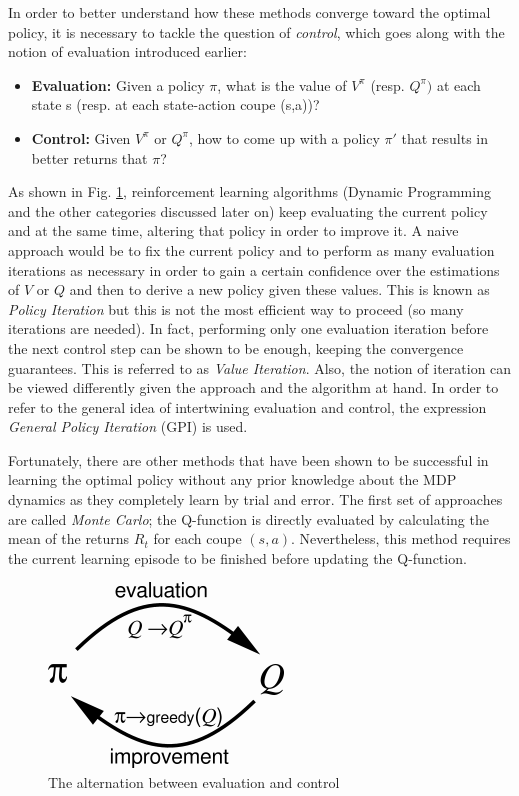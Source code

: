 				In order to better understand how these methods converge toward the optimal policy, it is necessary to tackle the question of \textit{control}, which goes along with the notion of evaluation introduced earlier:
				
				\begin{itemize}
					\item \textbf{Evaluation:} Given a policy $\pi$, what is the value of $V^{\pi}$ (resp. $Q^{\pi})$ at each state s (resp. at each state-action coupe (s,a))?
					\item \textbf{Control:} Given $V^{\pi}$ or $Q^{\pi}$, how to come up with a policy $\pi'$ that results in better returns that $\pi$?
				\end{itemize}
				
				As shown in Fig. \ref{fig:evalctrl}, reinforcement learning algorithms (Dynamic Programming and the other categories discussed later on) keep evaluating the current policy and at the same time, altering that policy in order to improve it. A naive approach would be to fix the current policy and to perform as many evaluation iterations as necessary in order to gain a certain confidence over the estimations of $V$ or $Q$ and then to derive a new policy given these values. This is known as \textit{Policy Iteration} but this is not the most efficient way to proceed (so many iterations are needed). In fact, performing only one evaluation iteration before the next control step can be shown to be enough, keeping the convergence guarantees. This is referred to as \textit{Value Iteration}. Also, the notion of iteration can be viewed differently given the approach and the algorithm at hand. In order to refer to the general idea of intertwining evaluation and control, the expression \textit{General Policy Iteration} (GPI) is used.

        Fortunately, there are other methods that have been shown to be successful in learning the optimal policy without any prior knowledge about the MDP dynamics as they completely learn by trial and error. The first set of approaches are called \textit{Monte Carlo}; the Q-function is directly evaluated by calculating the mean of the returns $R_t$ for each coupe $(s,a)$. Nevertheless, this method requires the current learning episode to be finished before updating the Q-function.

        \begin{figure}
          \centering
          \includegraphics[scale=0.7]{figures/evalctrl.png}
          \caption{The alternation between evaluation and control}
          \label{fig:evalctrl}
        \end{figure}

